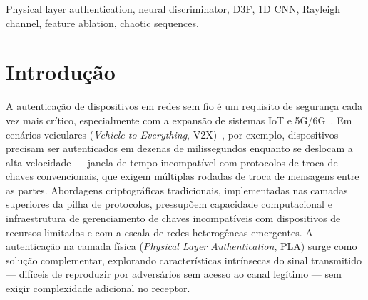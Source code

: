 \documentclass{sbrt}
\begin{document}
\begin{abstract}
This paper proposes the application of a neural network discriminator to the problem of physical layer authentication with chaotic authentication sequences (tags) over Rayleigh fading channels. We investigate three input representations for the discriminator: (i) a four-feature physically motivated vector, (ii) a 1D CNN over the equalized received signal after legitimate tag extraction ($\mathbf{z}_{eq}$), and (iii) a DNN over $\mathbf{z}_{eq}$. We show that $\mathbf{z}_{eq}$-based approaches fail at low SNR because coherent integration cannot be performed without explicit access to the reference tag. A systematic ablation study yields the central result: only two scalars per packet — the matched correlator output $|\tau|$ and received energy $E$ — are necessary and sufficient to outperform the classical correlator, achieving $P_D = 87{,}2\%$ at 0~dB versus $8{,}1\%$ for the analytical method.
\end{abstract}
\begin{keywords}
Physical layer authentication, neural discriminator, D3F, 1D CNN, Rayleigh channel, feature ablation, chaotic sequences.
\end{keywords}

\section{Introdução}

A autenticação de dispositivos em redes sem fio é um requisito de segurança cada vez mais crítico, especialmente com a expansão de sistemas IoT e 5G/6G~\cite{ref_xie}. Em cenários veiculares (\textit{Vehicle-to-Everything}, V2X)~\cite{ref_3gpp,ref_raya}, por exemplo, dispositivos precisam ser autenticados em dezenas de milissegundos enquanto se deslocam a alta velocidade — janela de tempo incompatível com protocolos de troca de chaves convencionais, que exigem múltiplas rodadas de troca de mensagens entre as partes. Abordagens criptográficas tradicionais, implementadas nas camadas superiores da pilha de protocolos, pressupõem capacidade computacional e infraestrutura de gerenciamento de chaves incompatíveis com dispositivos de recursos limitados e com a escala de redes heterogêneas emergentes. A autenticação na camada física (\textit{Physical Layer Authentication}, PLA) surge como solução complementar, explorando características intrínsecas do sinal transmitido — difíceis de reproduzir por adversários sem acesso ao canal legítimo — sem exigir complexidade adicional no receptor.
\end{document}
